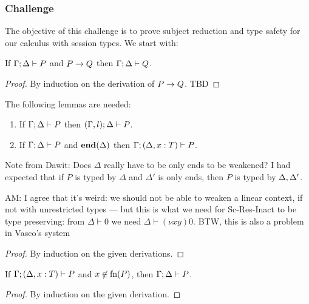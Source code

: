 \subsubsection{Challenge}
The objective of this challenge is to prove subject reduction and type safety for our calculus with session types. We start with:
\begin{theorem}
  If \( \Gamma;\Delta \vdash P \) and \( P \rightarrow Q \) then \( \Gamma;\Delta \vdash Q \).
\end{theorem}
\begin{proof}
  By induction on the derivation of $P \rightarrow Q$. TBD
\end{proof}

The following lemmas are needed:
\begin{lemma}[Weakening]\mbox{}
  \label{lemma:weak}
  \begin{enumerate}
  \item If \( \Gamma; \Delta \vdash P \) then
    \( (\Gamma, l);\Delta \vdash P \).
      \item If \( \Gamma; \Delta \vdash P \) and \( \mathbf{end}(\Delta) \) then
    \( \Gamma;(\Delta, x : T) \vdash P \).
  \end{enumerate}
  \begin{metanote}
    Note from Dawit: Does \( \Delta \) really have to be only ends to be weakened? I had expected that if \( P \) is typed by \( \Delta \) and \( \Delta' \) is only ends, then \( P \) is typed by \( \Delta, \Delta' \).
    
    AM:  I agree that it's weird: we should not be able to weaken a linear context, if not
    with unrestricted types --- but this is what we need for Sc-Res-Inact to be type preserving:
    from $\Delta\vdash 0$ we need $\Delta\vdash (\nu x y)0$. BTW, this is also a problem in Vasco's system 
  \end{metanote}
\end{lemma}
\begin{proof}
  By induction on the given derivations.
\end{proof}
\begin{lemma}[Strengthening]\mbox{}
  \label{lemma:strenD}
  If \( \Gamma; (\Delta, x : T) \vdash P \) and $x\not\in \textrm{fn}(P)$, then \( \Gamma; \Delta \vdash P \).
\end{lemma}
\begin{proof}
  By induction on the given derivation.
\end{proof}

